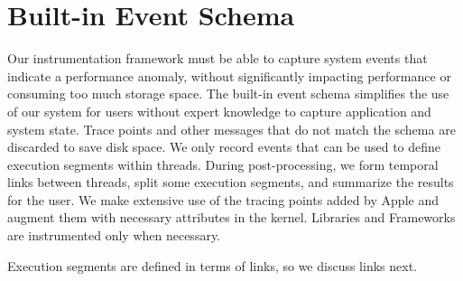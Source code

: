 \section{Built-in Event Schema}\label{section: builtin_event_schema}
Our instrumentation framework must be able to capture system events that indicate a performance anomaly, without significantly impacting performance or consuming too much storage space.
The built-in event schema simplifies the use of our system for users without expert knowledge to capture application and system state.
Trace points and other messages that do not match the schema are discarded to save disk space.
We only record events that can be used to define execution segments within threads.
During post-processing, we form temporal links between threads, split some execution segments, and summarize the results for the user.
We make extensive use of the tracing points added by Apple and augment them with necessary attributes in the kernel.
Libraries and Frameworks are instrumented only when necessary.

Execution segments are defined in terms of links, so we discuss links next.

